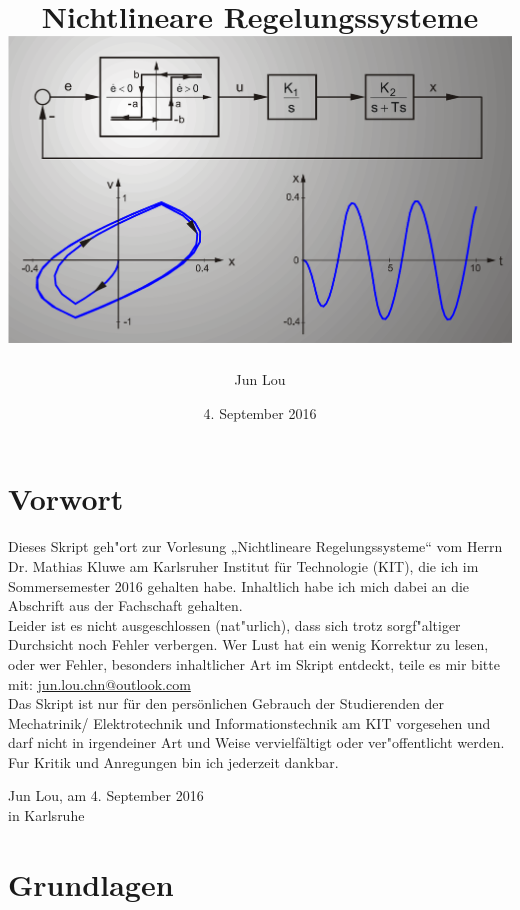 \documentclass[openany,a4paper,11pt]{book}
\title{\Huge \textbf{Nichtlineare Regelungssysteme}\\[2cm] \protect \includegraphics[width=\textwidth]{imgs/nlr.png}}
\author{Jun Lou}
\date{4. September 2016}
\begin{document}
\maketitle 
\pagestyle{plain}
\chapter*{Vorwort}   
Dieses Skript geh"ort zur Vorlesung „Nichtlineare Regelungssysteme“ vom Herrn Dr. Mathias Kluwe am Karlsruher Institut für Technologie (KIT), die ich im Sommersemester 2016 gehalten habe. Inhaltlich habe ich mich dabei an die Abschrift aus der Fachschaft gehalten. \\[5pt]
Leider ist es nicht ausgeschlossen (nat"urlich), dass sich trotz sorgf"altiger Durchsicht noch Fehler verbergen. Wer Lust hat ein wenig Korrektur zu lesen, oder wer Fehler, besonders inhaltlicher Art im Skript entdeckt, teile es mir bitte mit: {\color{blue}\href{mailto:jun.lou.chn@outlook.com}{jun.lou.chn@outlook.com}}\\[5pt]
Das Skript ist nur für den persönlichen Gebrauch der Studierenden der Mechatrinik/ Elektrotechnik und Informationstechnik am KIT vorgesehen und darf nicht in irgendeiner Art und Weise vervielfältigt oder ver"offentlicht werden. \\[5pt]
Fur Kritik und Anregungen bin ich jederzeit dankbar.\\[6pt]
\begin{flushright} Jun Lou, am 4. September 2016\\
in Karlsruhe\end{flushright}

\tableofcontents
\chapter[Grundlagen]{Grundlagen}
\end{document}
